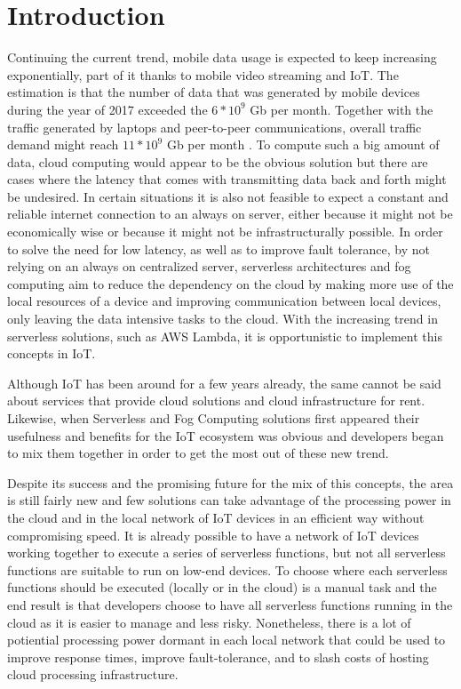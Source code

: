 \documentclass[conference]{IEEEtran}
\begin{document}
\section{Introduction}
Continuing the current trend, mobile data usage is expected to keep increasing
exponentially, part of it thanks to mobile video streaming and
IoT. The estimation is that the number of data that was generated
by mobile devices during the year of 2017 exceeded the $\displaystyle 6 * 10^9$ Gb
per month. Together with the traffic generated by laptops and peer-to-peer
communications, overall traffic demand might reach $\displaystyle 11 * 10^9$ Gb per
month\cite{kn:Dehos2014} \cite{kn:Baresi2017}. To compute such a big amount of
data, cloud computing would appear to be the obvious solution but there are cases
where the latency that comes with transmitting data back and forth might be
undesired. In certain situations it is also not feasible to expect a constant and
reliable internet connection to an always on server, either because it might not
be economically wise or because it might not be infrastructurally possible. In
order to solve the need for low latency, as well as to improve fault tolerance, by
not relying on an always on centralized server, serverless architectures and fog
computing aim to reduce the dependency on the cloud by making more use of the
local resources of a device and improving communication between local devices,
only leaving the data intensive tasks to the cloud\cite{kn:Baresi2017}. With the
increasing trend in serverless solutions, such as AWS Lambda, it is opportunistic
to implement this concepts in IoT.

Although IoT has been around for a few years already, the same cannot be said
about services that provide cloud solutions and cloud infrastructure for rent. 
Likewise, when Serverless and Fog Computing solutions first appeared their
usefulness and benefits for the IoT ecosystem was obvious and developers began to
mix them together in order to get the most out of these new trend.

Despite its success and the promising future for the mix of this concepts, the
area is still fairly new and few solutions can take advantage of the processing
power in the cloud and in the local network of IoT devices in an efficient way
without compromising speed. It is already possible to have a network of IoT
devices working together to execute a series of serverless functions, but not all
serverless functions are suitable to run on low-end devices. To choose where each
serverless functions should be executed (locally or in the cloud) is a manual task
and the end result is that developers choose to have all serverless functions
running in the cloud as it is easier to manage and less risky. Nonetheless, there
is a lot of potiential processing power dormant in each local network that could
be used to improve response times, improve fault-tolerance,  and to slash costs of
hosting cloud processing infrastructure. 
\end{document}
